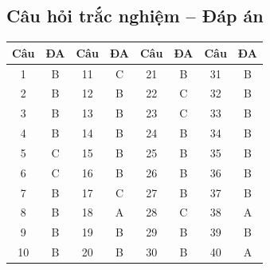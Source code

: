 \documentclass[10pt]{article}
\begin{document}
\subsection*{Câu hỏi trắc nghiệm -- Đáp án}

\begin{singlespace}
\begin{longtable}{|c|c||c|c||c|c||c|c|}
\hline
\textbf{Câu} & \textbf{ĐA} & \textbf{Câu} & \textbf{ĐA} & \textbf{Câu} & \textbf{ĐA} & \textbf{Câu} & \textbf{ĐA} \\
\hline
\endhead
1 & B & 11 & C & 21 & B & 31 & B \\
\hline
2 & B & 12 & B & 22 & C & 32 & B \\
\hline
3 & B & 13 & B & 23 & C & 33 & B \\
\hline
4 & B & 14 & B & 24 & B & 34 & B \\
\hline
5 & C & 15 & B & 25 & B & 35 & B \\
\hline
6 & C & 16 & B & 26 & B & 36 & B \\
\hline
7 & B & 17 & C & 27 & B & 37 & B \\
\hline
8 & B & 18 & A & 28 & C & 38 & A \\
\hline
9 & B & 19 & B & 29 & B & 39 & B \\
\hline
10 & B & 20 & B & 30 & B & 40 & A \\
\hline
\end{longtable}
\end{singlespace}
\end{document}
